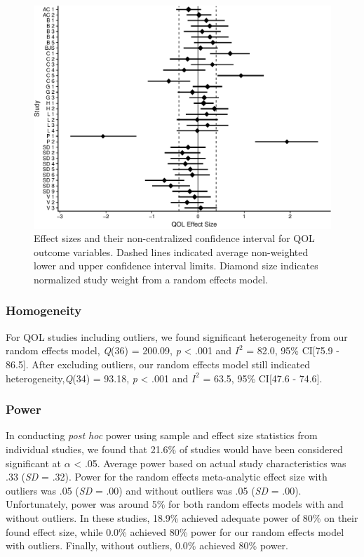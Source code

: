 \documentclass[english,man, mask]{apa6}
\theoremstyle{definition}
\theoremstyle{definition}
\theoremstyle{definition}
\theoremstyle{remark}
\begin{document}
\begin{figure}[htbp]
\centering
\includegraphics{meta_markdown_files/figure-latex/qolpic-1.pdf}
\caption{\label{fig:qolpic}Effect sizes and their non-centralized confidence
interval for QOL outcome variables. Dashed lines indicated average
non-weighted lower and upper confidence interval limits. Diamond size
indicates normalized study weight from a random effects model.}
\end{figure}

\subsubsection{Homogeneity}\label{homogeneity-2}

For QOL studies including outliers, we found significant heterogeneity
from our random effects model, \emph{Q}(36) = 200.09, \emph{p}
\textless{} .001 and \(I^2\) = 82.0, 95\% CI{[}75.9 - 86.5{]}. After
excluding outliers, our random effects model still indicated
heterogeneity,\emph{Q}(34) = 93.18, \emph{p} \textless{} .001 and
\(I^2\) = 63.5, 95\% CI{[}47.6 - 74.6{]}.

\subsubsection{Power}\label{power-2}

In conducting \emph{post hoc} power using sample and effect size
statistics from individual studies, we found that 21.6\% of studies
would have been considered significant at \(\alpha\) \textless{} .05.
Average power based on actual study characteristics was .33 (\emph{SD} =
.32). Power for the random effects meta-analytic effect size with
outliers was .05 (\emph{SD} = .00) and without outliers was .05
(\emph{SD} = .00). Unfortunately, power was around 5\% for both random
effects models with and without outliers. In these studies, 18.9\%
achieved adequate power of 80\% on their found effect size, while 0.0\%
achieved 80\% power for our random effects model with outliers. Finally,
without outliers, 0.0\% achieved 80\% power.
\end{document}
